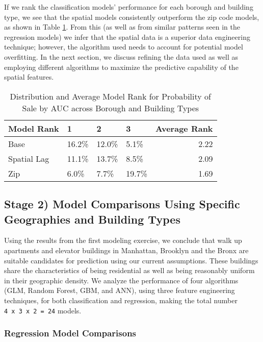 \documentclass[12pt,]{article}
\begin{document}
If we rank the classification models' performance for each borough and
building type, we see that the spatial models consistently outperform
the zip code models, as shown in Table \ref{tab:ProbModelAUCRank}. From
this (as well as from similar patterns seen in the regression models) we
infer that the spatial data is a superior data engineering technique;
however, the algorithm used needs to account for potential model
overfitting. In the next section, we discuss refining the data used as
well as employing different algorithms to maximize the predictive
capability of the spatial features.

\begin{table}

\caption{\label{tab:Prob Model AUC Average Rank}\label{tab:ProbModelAUCRank} Distribution and Average Model Rank for Probability of Sale by AUC across Borough and Building Types}
\centering
\begin{tabular}[t]{llllr}
\toprule
Model Rank & 1 & 2 & 3 & Average Rank\\
\midrule
Base & 16.2\% & 12.0\% & 5.1\% & 2.22\\
Spatial Lag & 11.1\% & 13.7\% & 8.5\% & 2.09\\
Zip & 6.0\% & 7.7\% & 19.7\% & 1.69\\
\bottomrule
\end{tabular}
\end{table}

\hypertarget{stage-2-model-comparisons-using-specific-geographies-and-building-types}{%
\subsection{Stage 2) Model Comparisons Using Specific Geographies and
Building
Types}\label{stage-2-model-comparisons-using-specific-geographies-and-building-types}}

Using the results from the first modeling exercise, we conclude that
walk up apartments and elevator buildings in Manhattan, Brooklyn and the
Bronx are suitable candidates for prediction using our current
assumptions. These buildings share the characteristics of being
residential as well as being reasonably uniform in their geographic
density. We analyze the performance of four algorithms (GLM, Random
Forest, GBM, and ANN), using three feature engineering techniques, for
both classification and regression, making the total number
\texttt{4\ x\ 3\ x\ 2\ =\ 24} models.

\hypertarget{regression-model-comparisons}{%
\subsubsection{Regression Model
Comparisons}\label{regression-model-comparisons}}
\end{document}
